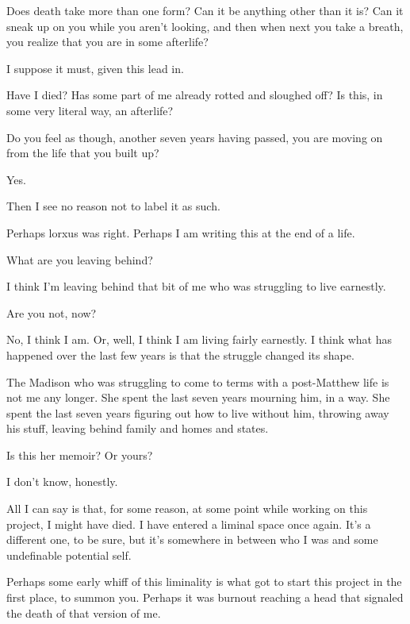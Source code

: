\label{ally:30}
\begin{paracol}{2}
  \begin{leftcolumn}
\noindent Does death take more than one form? Can it be anything other than it is? Can it sneak up on you while you aren't looking, and then when next you take a breath, you realize that you are in some afterlife?

\begin{ally}
I suppose it must, given this lead in.
\end{ally}
Have I died? Has some part of me already rotted and sloughed off? Is this, in some very literal way, an afterlife?

\begin{ally}
Do you feel as though, another seven years having passed, you are moving on from the life that you built up?
\end{ally}
Yes.

\begin{ally}
Then I see no reason not to label it as such.
\end{ally}
Perhaps lorxus was right. Perhaps I am writing this at the end of a life.

\begin{ally}
What are you leaving behind?
\end{ally}
I think I'm leaving behind that bit of me who was struggling to live earnestly.

\begin{ally}
Are you not, now?
\end{ally}
No, I think I am. Or, well, I think I am living fairly earnestly. I think what has happened over the last few years is that the struggle changed its shape.

The Madison who was struggling to come to terms with a post-Matthew life is not me any longer. She spent the last seven years mourning him, in a way. She spent the last seven years figuring out how to live without him, throwing away his stuff, leaving behind family and homes and states.

\begin{ally}
Is this her memoir? Or yours?
\end{ally}
I don't know, honestly.

All I can say is that, for some reason, at some point while working on this project, I might have died. I have entered a liminal space once again. It's a different one, to be sure, but it's somewhere in between who I was and some undefinable potential self.

Perhaps some early whiff of this liminality is what got to start this project in the first place, to summon you. Perhaps it was burnout reaching a head that signaled the death of that version of me. 
\newpage
  \end{leftcolumn}
\end{paracol}
